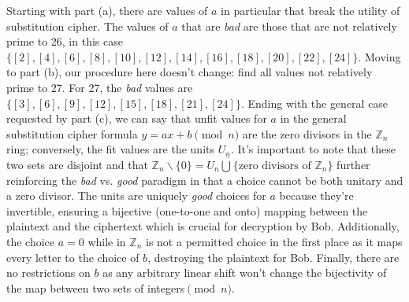 \documentclass[12pt]{article}
\theoremstyle{remark}  %
\begin{document}
    Starting with part (a), there are values of $a$ in particular that break the utility of substitution cipher. The values of $a$ that are \emph{bad} are those that are not relatively prime to 26, in this case $\{[2],[4],[6],[8],[10],[12],[14],[16],[18],[20],[22],[24]\}$. Moving to part (b), our procedure here doesn't change: find all values not relatively prime to 27. For 27, the \emph{bad} values are $\{[3], [6], [9], [12], [15], [18], [21], [24]\}$. Ending with the general case requested by part (c), we can say that unfit values for $a$ in the general substitution cipher formula $y=ax+b \pmod{n}$ are the zero divisors in the $\mathbb{Z}_n$ ring; conversely, the fit values are the units $U_n$. It's important to note that these two sets are disjoint and that $\mathbb{Z}_n\backslash\{0\}=U_n\mathbin{\dot{\bigcup}}\{\text{zero divisors of }\mathbb{Z}_n\}$ further reinforcing the \emph{bad} vs. \emph{good} paradigm in that a choice cannot be both unitary and a zero divisor. The units are uniquely \emph{good} choices for $a$ because they're invertible, ensuring a bijective (one-to-one and onto) mapping between the plaintext and the ciphertext which is crucial for decryption by Bob. Additionally, the choice $a=0$ while in $\mathbb{Z}_n$ is not a permitted choice in the first place as it maps every letter to the choice of $b$, destroying the plaintext for Bob. Finally, there are no restrictions on $b$ as any arbitrary linear shift won't change the bijectivity of the map between two sets of integers$\pmod{n}$.
\vspace{5pt}
    \setcounter{problem}{2}
\end{document}
